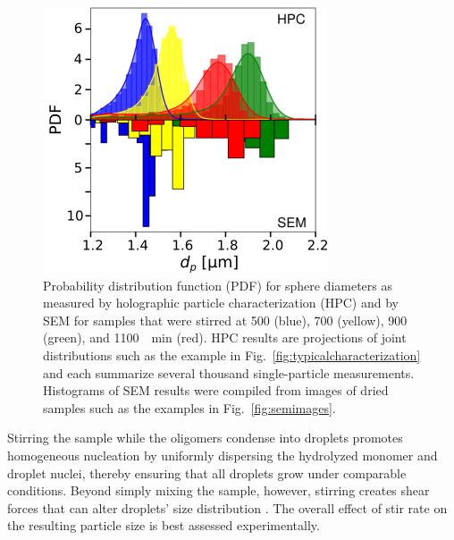 \documentclass[journal=langd5,manuscript=article,layout=twocolumn]{achemso}
\begin{document}
\begin{figure}[!t]
\centering
\includegraphics[width=0.9\columnwidth]{sizedistributions03.png}
\caption{Probability distribution function (PDF) for 
    sphere diameters as measured by
     holographic particle characterization (HPC) and by SEM for
      samples that were stirred at 
      \num{500} (blue), 
      \num{700} (yellow), 
      \num{900} (green), 
      and \SI{1100}{\per\minute} (red).
    HPC results are projections of joint
      distributions such as the example in
      Fig.~\ref{fig:typicalcharacterization}
      and each summarize several thousand single-particle measurements.
      Histograms of SEM results were compiled from
      images of dried samples such as the
      examples in Fig.~\ref{fig:semimages}.}
\label{fig:sizedistribution}
\end{figure}


Stirring the sample while the oligomers condense into droplets promotes homogeneous
nucleation by uniformly dispersing the hydrolyzed monomer and droplet nuclei,
thereby ensuring that all droplets grow under comparable conditions.
Beyond simply mixing the sample, however, stirring creates shear forces \cite{halasz2007vortex} that
can alter droplets' size distribution \cite{oles1992shear,eggersdorfer2010fragmentation}.
The overall effect of stir rate on the resulting particle size is best assessed
experimentally.
\end{document}
